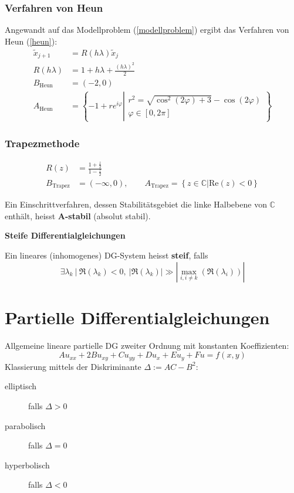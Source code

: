 		\subsubsection{Verfahren von Heun}
			Angewandt auf das Modellproblem (\ref{modellproblem}) ergibt das Verfahren von Heun (\ref{heun}):
			\begin{align*}
				\tilde x_{j+1} &= R(h\lambda)\tilde x_j \\
				R(h\lambda) &= 1 + h\lambda + \frac{(h\lambda)^2}{2} \\
				B_\text{Heun} &= (-2,0) \\
				A_\text{Heun} &= \left\{
					-1 + re^{i\varphi} \left|\begin{array}{l}
						r^2 = \sqrt{\cos^2(2\varphi)+3}-\cos(2\varphi) \\
						\varphi \in [0, 2\pi]
					\end{array}\right.
				\right\}
			\end{align*}

		\subsubsection{Trapezmethode}
			\begin{align*}
				R(z) &= \frac{1+\frac{z}{2}}{1-\frac{z}{2}} \\
				B_\text{Trapez} &= (-\infty,0), \qquad A_\text{Trapez} = \left\{ z \in \mathbb{C} \big\vert \text{Re}(z) <0\right\}
			\end{align*}

			Ein Einschrittverfahren, dessen Stabilitätsgebiet die linke Halbebene von $\mathbb{C}$ enthält, heisst \textbf{A-stabil} (absolut stabil).

			\vspace{5pt}
			\begin{definition}
				\textbf{Steife Differentialgleichungen}

				Ein lineares (inhomogenes) DG-System heisst \textbf{steif}, falls
				\[
					\exists \lambda_k \ \Big| \ \Re(\lambda_k) < 0, \ |\Re(\lambda_k)| \gg |\max_{i, i \neq k}(\Re(\lambda_i))|
				\]
			\end{definition}

\section{Partielle Differentialgleichungen}
	Allgemeine lineare partielle DG zweiter Ordnung mit konstanten Koeffizienten:
	\[
		A u_{xx} + 2Bu_{xy} + Cu_{yy}+ Du_x+ E u_y + Fu= f(x,y)
	\]
	Klassierung mittels der Diskriminante $\Delta := AC-B^2$:
	\begin{description}
		\item[elliptisch]   falls $\Delta > 0$
		\item[parabolisch]  falls $\Delta = 0$
		\item[hyperbolisch] falls $\Delta < 0$
	\end{description}

